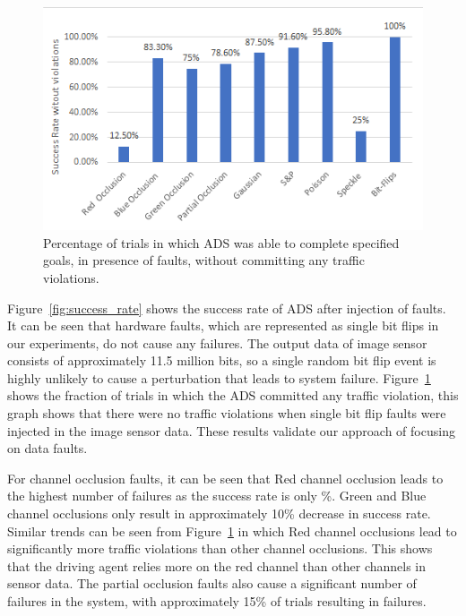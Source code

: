 \begin{figure}  
	\vspace{1.0em}
	\centering
	\includegraphics[scale=0.7]{no_violations}
	\vspace{-0.5em}
	\caption{Percentage of trials in which ADS was able to complete specified goals, in presence of faults, without committing any traffic violations.}
	\label{fig:no_violations}
	\vspace{-1.5em}
\end{figure}

Figure~\ref{fig:success_rate} shows the success rate of ADS after injection of faults. It can be seen that hardware faults, which are represented as single bit flips in our experiments, do not cause any failures. The output data of image sensor consists of approximately 11.5 million bits, so a single random bit flip event is highly unlikely to cause a perturbation that leads to system failure. Figure~\ref{fig:no_violations} shows the fraction of trials in which the ADS committed any traffic violation, this graph shows that there were no traffic violations when single bit flip faults were injected in the image sensor data. These results validate our approach of focusing on data faults.

For channel occlusion faults, it can be seen that Red channel occlusion leads to the highest number of failures as the success rate is only \%. Green and Blue channel occlusions only result in approximately 10\% decrease in success rate. Similar trends can be seen from Figure~\ref{fig:no_violations} in which Red channel occlusions lead to significantly more traffic violations than other channel occlusions. This shows that the driving agent relies more on the red channel than other channels in sensor data. The partial occlusion faults also cause a significant number of failures in the system, with approximately 15\% of trials resulting in failures.

